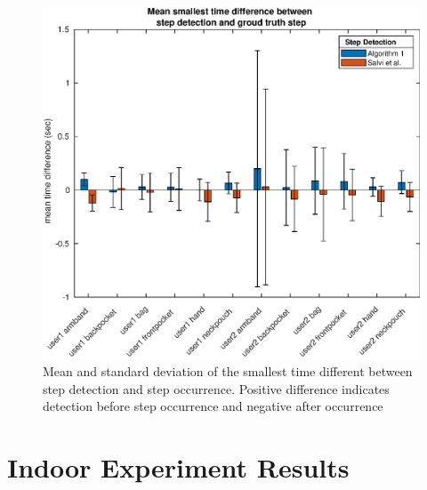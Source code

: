 \begin{figure}[H]
	\centering
	\includegraphics[width=0.7\linewidth]{images/20201113_0914_smallest_diff_to_gt_1}
	\caption{Mean and standard deviation of the smallest time different between step detection and step occurrence. Positive difference indicates detection before step occurrence and negative after occurrence}
	\label{fig:app_smallest_diff_to_gt_1}
\end{figure}

\chapter{Indoor Experiment Results}

